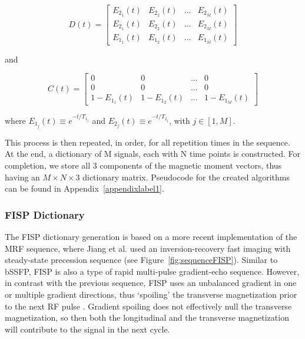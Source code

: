 \begin{equation}
    D(t)  = 
    \begin{bmatrix}
        E_{2_1}(t)  & E_{2_2}(t)  & \dots & E_{2_M}(t)  \\
        E_{2_1}(t)  & E_{2_2}(t)  & \dots & E_{2_M}(t)  \\
        E_{1_1}(t)  & E_{1_2}(t)  & \dots & E_{1_M}(t)  
    \end{bmatrix}
\end{equation}

and

\begin{equation}
    C(t)  = 
    \begin{bmatrix}
        0 & 0 & \dots & 0 \\
        0 & 0 & \dots & 0 \\
        1 - E_{1_1}(t)  & 1- E_{1_2}(t)  & \dots & 1- E_{1_M}(t)  
    \end{bmatrix} 
\end{equation}

where $E_{1_j}(t) \equiv e^{-t/T_{1_j}}$ and $E_{2_j}(t) \equiv e^{-t/T_{2_j}}$, with $j \in [1, M]$.

\hfill 

This process is then repeated, in order, for all repetition times in the sequence.
At the end, a dictionary of M signals, each with N time points is constructed.
For completion, we store all 3 components of the magnetic moment vectors, thus having an $M \times N \times 3$ dictionary matrix.
Pseudocode for the created algorithms can be found in Appendix~\ref{appendixlabel1}.

\hfill

\subsubsection{FISP Dictionary} 
\label{method:fispdictionary}

The FISP dictionary generation is based on a more recent implementation of the MRF sequence, where Jiang et al. \cite{Jiang2015} used an inversion-recovery fast imaging with steady-state precession sequence (see Figure~\ref{fig:sequenceFISP}).
Similar to bSSFP, FISP is also a type of rapid multi-pulse gradient-echo sequence.
However, in contrast with the previous sequence, FISP uses an unbalanced gradient in one or multiple gradient directions, thus `spoiling' the transverse magnetization prior to the next RF pulse \cite{Hargreaves2012}.
Gradient spoiling does not effectively null the transverse magnetization, so then both the longitudinal and the transverse magnetization will contribute to the signal in the next cycle.

